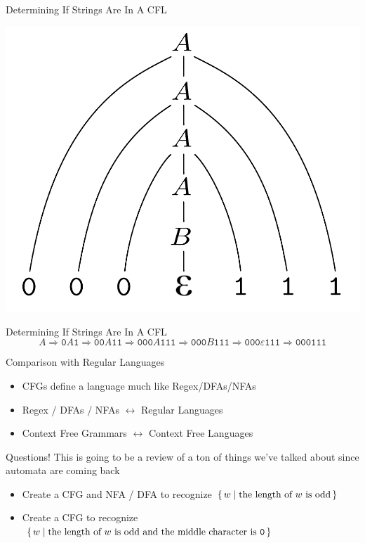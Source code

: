 \documentclass[aspectratio=169]{beamer}
\begin{document}
\begin{frame}{Determining If Strings Are In A CFL}
    \begin{center}
        \includegraphics[scale=0.33]{images/CFG_tree.png}
    \end{center}
\end{frame}

\begin{frame}{Determining If Strings Are In A CFL}
    $$
        A \Rightarrow \texttt{0}A\texttt{1} \Rightarrow \texttt{00}A\texttt{11} \Rightarrow \texttt{000}A\texttt{111} \Rightarrow \texttt{000}B\texttt{111} \Rightarrow \texttt{000}\varepsilon\texttt{111} \Rightarrow \texttt{000}\texttt{111}
    $$
\end{frame}

\begin{frame}{Comparison with Regular Languages}
    \begin{itemize}
        \item CFGs define a language much like Regex/DFAs/NFAs \pause
        \item Regex / DFAs / NFAs $\leftrightarrow$ Regular Languages 
        \item Context Free Grammars $\leftrightarrow$ Context Free Languages 
    \end{itemize}
\end{frame}

\begin{frame}{Questions!}
    This is going to be a review of a ton of things we've talked about since automata are coming back \pause
    \begin{itemize}
        \item Create a CFG and NFA / DFA to recognize $\set{w | \text{the length of } w \text{ is odd}}$
        \item Create a CFG to recognize $\set{w | \text{the length of } w \text{ is odd and the middle character is } \texttt{0}}$
    \end{itemize}
\end{frame}
\end{document}
